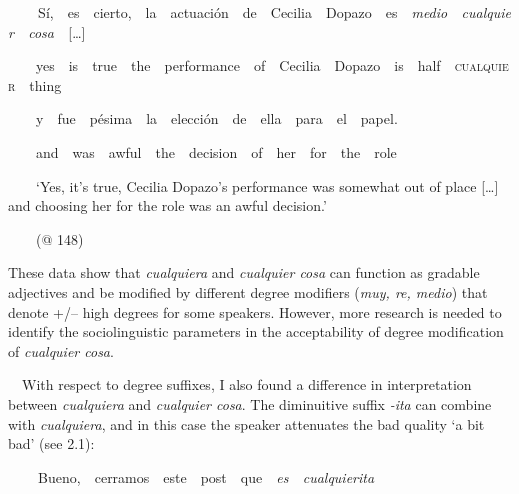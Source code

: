 \begin{styleStandard}
\textbf{\ \ }\ \ Sí,\ \ es\ \ cierto,\ \ la\ \ actuación\ \ de\ \ Cecilia\ \ Dopazo\ \ es\ \ \textit{medio\ \ cualquier\ \ cosa\ \ }[…]
\end{styleStandard}

\begin{styleStandard}
\ \ \ \ yes\ \ is\ \ true\ \ the\ \ performance\ \ of\ \ Cecilia\ \ Dopazo\ \ is\ \ half\ \ \textsc{cualquier}\ \ thing\ \ 
\end{styleStandard}

\begin{styleStandard}
\ \ \ \ y\ \ fue\ \ pésima\ \ la\ \ elección\ \ de\ \ ella\ \ para\ \ el\ \ papel.
\end{styleStandard}

\begin{styleStandard}
\ \ \ \ and\ \ was\ \ awful\ \ the\ \ decision\ \ of\ \ her\ \ for\ \ the\ \ role
\end{styleStandard}

\begin{styleStandard}
\ \ \ \ ‘Yes, it’s true, Cecilia Dopazo’s performance was somewhat out of place […] and choosing her for the role was an awful decision.’
\end{styleStandard}

\begin{styleStandard}
\ \ \ \ (@ 148)
\end{styleStandard}

\begin{styleStandard}
These data show that \textit{cualquiera }and \textit{cualquier cosa} can function as gradable adjectives and be modified by different degree modifiers (\textit{muy, re, medio}) that denote +/– high degrees for some speakers. However, more research is needed to identify the sociolinguistic parameters in the acceptability of degree modification of \textit{cualquier cosa}. 
\end{styleStandard}

\begin{styleStandard}
\ \ With respect to degree suffixes, I also found a difference in interpretation between \textit{cualquiera} and \textit{cualquier cosa}. The diminuitive\textit{ }suffix\textit{ -ita} can combine with \textit{cualquiera}, and in this case the speaker attenuates the bad quality ‘a bit bad’ (see 2.1):
\end{styleStandard}

\begin{styleStandard}
\textbf{\ \ }\ \ Bueno,\ \ cerramos\ \ este\ \ post\ \ que\ \ \textit{es\ \ cualquierita}
\end{styleStandard}


